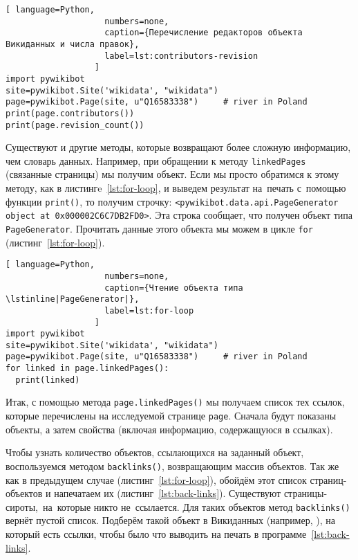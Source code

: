 \begin{lstlisting}[ language=Python,
                    numbers=none,
                    caption={Перечисление редакторов объекта Викиданных и числа правок},
                    label=lst:contributors-revision
                  ]
import pywikibot
site=pywikibot.Site('wikidata', "wikidata")
page=pywikibot.Page(site, u"Q16583338")     # river in Poland
print(page.contributors())
print(page.revision_count())
\end{lstlisting}

Существуют и другие методы, которые возвращают более сложную информацию, 
чем словарь данных. Например, при обращении к методу \lstinline|linkedPages| (связанные страницы) 
мы получим объект. 
Если мы просто обратимся к этому методу, как в листингe~\ref{lst:for-loop}, 
и выведем результат на~печать с~помощью функции \lstinline|print()|, то получим строчку: 
\lstinline|<pywikibot.data.api.PageGenerator object at 0x000002C6C7DB2FD0>|. 
Эта строка сообщает, что получен объект типа \lstinline|PageGenerator|. 
Прочитать данные этого объекта мы можем в цикле \lstinline|for| (листинг~\ref{lst:for-loop}).

\begin{lstlisting}[ language=Python,
                    numbers=none,
                    caption={Чтение объекта типа \lstinline|PageGenerator|},
                    label=lst:for-loop
                  ]
import pywikibot
site=pywikibot.Site('wikidata', "wikidata")
page=pywikibot.Page(site, u"Q16583338")     # river in Poland
for linked in page.linkedPages():
  print(linked)
\end{lstlisting}

Итак, с помощью метода \lstinline|page.linkedPages()| мы получаем список тех ссылок, 
которые перечислены на исследуемой странице \lstinline|page|. 
Сначала будут показаны объекты, а затем свойства (включая информацию, содержащуюся в ссылках).

Чтобы узнать количество объектов, ссылающихся на заданный объект, 
воспользуемся методом \lstinline|backlinks()|, возвращающим массив объектов. 
Так же как в предыдущем случае (листинг~\ref{lst:for-loop}), 
обойдём этот список страниц-объектов 
и напечатаем их (листинг~\ref{lst:back-links}). 
Существуют страницы-сироты,\, 
на~которые никто не~ссылается. 
Для таких объектов метод \lstinline|backlinks()| вернёт пустой список. 
Подберём такой объект в Викиданных (например, ), 
на который есть ссылки, чтобы было что выводить на печать в программе~\ref{lst:back-links}.


